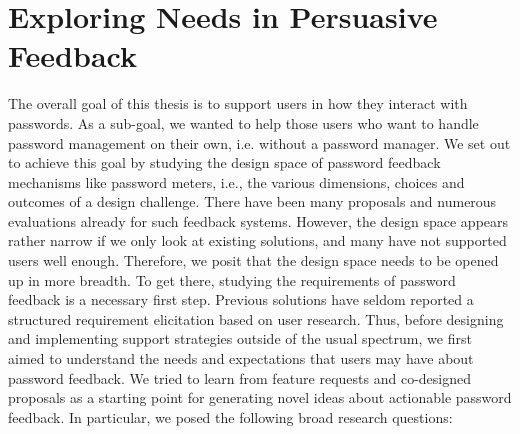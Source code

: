 \chapter[Exploring Needs in Persuasive Feedback] {Exploring Needs in Persuasive Feedback}\label{chap:feedback_modalities}




The overall goal of this thesis is to support users in how they interact with passwords. As a sub-goal, we wanted to help those users who want to handle password management on their own, i.e. without a password manager. We set out to achieve this goal by studying the design space of password feedback mechanisms like password meters, i.e., the various dimensions, choices and outcomes of a design challenge. There have been many proposals and numerous evaluations already for such feedback systems. However, the design space appears rather narrow if we only look at existing solutions, and many have not supported users well enough. Therefore, we posit that the design space needs to be opened up in more breadth. To get there, studying the requirements of password feedback is a necessary first step. Previous solutions have seldom reported a structured requirement elicitation based on user research. Thus, before designing and implementing support strategies outside of the usual spectrum, we first aimed to understand the needs and expectations that users may have about password feedback. We tried to learn from feature requests and co-designed proposals as a starting point for generating novel ideas about actionable password feedback. In particular, we posed the following broad research questions:

